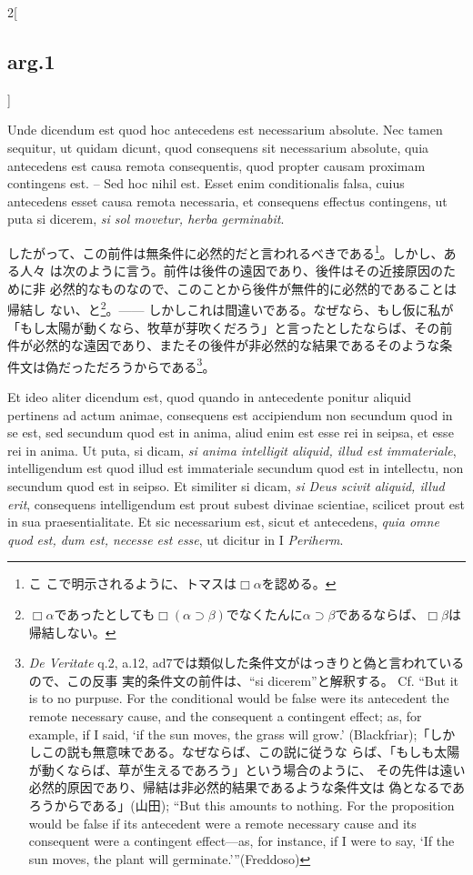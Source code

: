 \documentclass[paper=a4paper,fontsize=10pt,jafontsize=9pt,titlepage]{jlreq}
\begin{document}
\begin{paracol}{2}[\subsection{arg.1}]
\switchcolumn*

Unde dicendum est quod hoc antecedens est necessarium absolute. Nec
tamen sequitur, ut quidam dicunt, quod consequens sit necessarium
absolute, quia antecedens est causa remota consequentis, quod propter
causam proximam contingens est. -- Sed hoc nihil est. Esset enim
conditionalis falsa, cuius antecedens esset causa remota necessaria,
et consequens effectus contingens, ut puta si dicerem, {\itshape si
sol movetur, herba germinabit}.

\switchcolumn

したがって、この前件は無条件に必然的だと言われるべきである\footnote{こ
こで明示されるように、トマスは$\Box \alpha$を認める。}。しかし、ある人々
は次のように言う。前件は後件の遠因であり、後件はその近接原因のために非
必然的なものなので、このことから後件が無件的に必然的であることは帰結し
ない、と\footnote{$\Box \alpha$であったとしても$\Box(\alpha \supset
\beta)$でなくたんに$\alpha \supset \beta$であるならば、$\Box \beta$は
帰結しない。}。------ しかしこれは間違いである。なぜなら、もし仮に私が
「もし太陽が動くなら、牧草が芽吹くだろう」と言ったとしたならば、その前
件が必然的な遠因であり、またその後件が非必然的な結果であるそのような条
件文は偽だっただろうからである\footnote{{\itshape De Veritate} q.2,
a.12, ad7では類似した条件文がはっきりと偽と言われているので、この反事
実的条件文の前件は、``si dicerem''と解釈する。 Cf. ``But it is to no
purpuse. For the conditional would be false were its antecedent the
remote necessary cause, and the consequent a contingent effect; as,
for example, if I said, `if the sun moves, the grass will grow.'
(Blackfriar);「しかしこの説も無意味である。なぜならば、この説に従うな
らば、「もしも太陽が動くならば、草が生えるであろう」という場合のように、
その先件は遠い必然的原因であり、帰結は非必然的結果であるような条件文は
偽となるであろうからである」(山田); ``But this amounts to nothing. For
the proposition would be false if its antecedent were a remote
necessary cause and its consequent were a contingent effect—as, for
instance, if I were to say, ‘If the sun moves, the plant will
germinate.’''(Freddoso)}。

\switchcolumn*

Et ideo aliter dicendum est, quod quando in antecedente ponitur
aliquid pertinens ad actum animae, consequens est accipiendum non
secundum quod in se est, sed secundum quod est in anima, aliud enim
est esse rei in seipsa, et esse rei in anima. Ut puta, si dicam,
{\itshape si anima intelligit aliquid, illud est immateriale},
intelligendum est quod illud est immateriale secundum quod est in
intellectu, non secundum quod est in seipso. Et similiter si dicam,
{\itshape si Deus scivit aliquid, illud erit}, consequens
intelligendum est prout subest divinae scientiae, scilicet prout est
in sua praesentialitate. Et sic necessarium est, sicut et antecedens,
{\itshape quia omne quod est, dum est, necesse est esse}, ut dicitur
in I {\itshape Periherm}.


\end{paracol}
\end{document}
